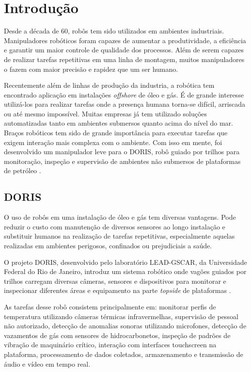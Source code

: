\chapter{Introdução}

Desde a década de 60, robôs tem sido utilizados em ambientes industriais. Manipuladores robóticos foram capazes de aumentar a produtividade, a eficiência e garantir um maior controle de qualidade dos processos. Além de serem capazes de realizar tarefas repetitivas em uma linha de montagem, muitos manipuladores o fazem com maior precisão e rapidez que um ser humano. 

Recentemente além de linhas de produção da industria, a robótica tem encontrado aplicação em instalações \textit{offshore} de óleo e gás. É de grande interesse utilizá-los para realizar tarefas onde a presença humana torna-se difícil, arriscada ou até mesmo impossível. Muitas empresas já tem utilizado soluções automatizadas tanto em ambientes submersos quanto acima do nível do mar. Braços robóticos tem sido de grande importância para executar tarefas que exigem interação mais complexa com o ambiente. Com isso em mente, foi desenvolvido um manipulador leve para o DORIS, robô guiado por trilhos para monitoração, inspeção e supervisão de ambientes não submersos de plataformas de petróleo \citep{xaud2016doris}.

\section{DORIS}
O uso de robôs em uma instalação de óleo e gás tem diversas vantagens. Pode reduzir o custo com manutenção de diversos sensores ao longo instalação e substituir humanos na realização de tarefas repetitivas, especialmente aquelas realizadas em ambientes perigosos, confinados ou prejudiciais a saúde. 

O projeto DORIS, desenvolvido pelo laboratório LEAD-GSCAR, da Universidade Federal do Rio de Janeiro, introduz um sistema robótico onde vagões guiados por trilhos carregam diversas câmeras, sensores e dispositivos para monitorar e inspecionar diferentes áreas e equipamento na parte \textit{topside} de plataformas \citep{nunes2013doris, galassi2014doris, freitas2015embedded}.

As tarefas desse robô consistem principalmente em: monitorar perfis de temperatura utilizando câmeras térmicas infravermelhas, supervisão de pessoal não autorizado, detecção de anomalias sonoras utilizando microfones, detecção de vazamentos de gás com sensores de hidrocarbonetos, inspeção de padrões de vibração de maquinário crítico, interação com interfaces touchscreen na plataforma, processamento de dados coletados, armazenamento e transmissão de áudio e vídeo em tempo real.

